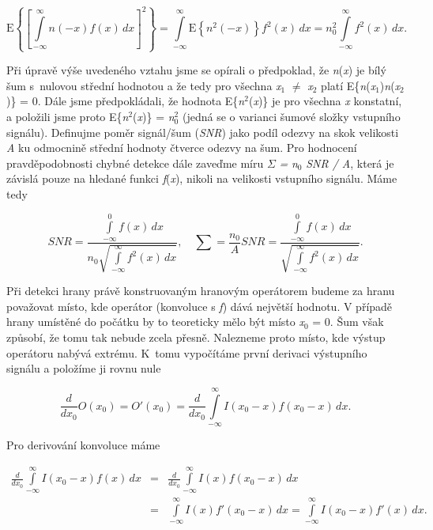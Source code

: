 \begin{equation} \label{eq:8_28}
    \mathrm{E} \left\{ \left[ \int\limits_{-\infty}^{\infty} n(-x)f(x)\,dx \right]^2 \right\} = \int\limits_{-\infty}^{\infty} \mathrm{E} \left\{ n^2(-x) \right\} f^2(x)\,dx = n_0^2 \int\limits_{-\infty}^{\infty} f^2(x)\,dx .
\end{equation}

Při úpravě výše uvedeného vztahu jsme se opírali o předpoklad, že \textit{n}(\textit{x}) je bílý šum s~nulovou střední hodnotou a že tedy pro všechna \textit{x}$_1$ $\neq$ \textit{x}$_2$ platí E\{\textit{n}(\textit{x}$_1$)\textit{n}(\textit{x}$_2$)\} = 0. Dále jsme předpokládali, že hodnota E\{\textit{n}$^2$(\textit{x})\} je pro všechna \textit{x} konstatní, a položili jsme proto E\{\textit{n}$^2$(\textit{x})\} = \textit{n}$_0^2$ (jedná se o varianci šumové složky vstupního signálu). Definujme poměr signál/šum (\textit{SNR}) jako podíl odezvy na skok velikosti \textit{A} ku odmocnině střední hodnoty čtverce odezvy na šum. Pro hodnocení pravděpodobnosti chybné detekce dále zaveďme míru $\Sigma$ \textit{=} \textit{n}$_0$\textit{ SNR / A}, která je závislá pouze na hledané funkci \textit{f}(\textit{x}), nikoli na velikosti vstupního signálu. Máme tedy

\begin{equation} \label{eq:8_29}
    SNR = \frac{\int\limits_{-\infty}^{0} f(x)\,dx}{n_0 \sqrt{\int\limits_{-\infty}^{\infty} f^2(x)\,dx}}, \quad \sum = \frac{n_0}{A} SNR = \frac{\int\limits_{-\infty}^{0} f(x)\,dx}{\sqrt{\int\limits_{-\infty}^{\infty}f^2(x)\,dx}} .
\end{equation}

Při detekci hrany právě konstruovaným hranovým operátorem budeme za hranu považovat místo, kde operátor (konvoluce s \textit{f}) dává největší hodnotu. V případě hrany umístěné do počátku by to teoreticky mělo být místo \textit{x}$_0$ = 0. Šum však způsobí, že tomu tak nebude zcela přesně. Nalezneme proto místo, kde výstup operátoru nabývá extrému. K~tomu vypočítáme první derivaci výstupního signálu a položíme ji rovnu nule

\begin{equation} \label{eq:8_30}
    \frac{d}{dx_0} O(x_0) = O'(x_0) = \frac{d}{dx_0} \int\limits_{-\infty}^{\infty} I(x_0 - x) f(x_0 - x)\,dx.
\end{equation}

Pro derivování konvoluce máme

\begin{eqnarray} \label{eq:8_31}
    \frac{d}{dx_0} \int\limits_{-\infty}^{\infty} I(x_0 - x) f(x)\,dx &=& \frac{d}{dx_0} \int\limits_{-\infty}^{\infty} I(x)f(x_0 - x)\,dx \\
    &=& \int\limits_{-\infty}^{\infty} I(x) f'(x_0 - x)\,dx = \int\limits_{-\infty}^{\infty} I(x_0 - x) f'(x)\,dx .\nonumber
\end{eqnarray}

